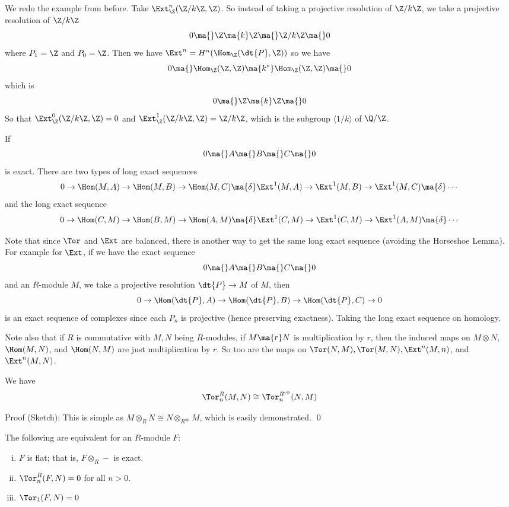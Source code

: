\begin{ex}
We redo the example from before. Take $\Ext_{\Z}^n(\Z/k\Z,\Z)$. So instead of taking a projective resolution of $\Z/k\Z$, we take a projective resolution of $\Z/k\Z$
\[
0 \ma{} \Z \ma{k} \Z \ma{} \Z/k\Z \ma{} 0
\]
where $P_1=\Z$ and $P_0=\Z$. Then we have $\Ext^n=H^n(\Hom_{\Z}(\dt{P},\Z))$ so we have
\[
0 \ma{} \Hom_{\Z}(\Z,\Z) \ma{k^*} \Hom_{\Z}(\Z,\Z) \ma{} 0 
\]
which is
\[
0 \ma{} \Z \ma{k} \Z \ma{} 0
\]
So that $\Ext_{\Z}^0(\Z/k\Z,\Z)=0$ and $\Ext_{\Z}^1(\Z/k\Z,\Z)=\Z/k\Z$, which is the subgroup $\langle 1/k \rangle$ of $\Q/\Z$. 
\end{ex}

\begin{cor}
If 
\[
0 \ma{} A \ma{} B \ma{} C \ma{} 0
\]
is exact. There are two types of long exact sequences
\[
0 \to \Hom(M,A) \to \Hom(M,B) \to \Hom(M,C) \ma{\delta} \Ext^1(M,A) \to \Ext^1(M,B) \to \Ext^1(M,C) \ma{\delta} \cdots
\]
and the long exact sequence
\[
0 \to \Hom(C,M) \to \Hom(B,M) \to \Hom(A,M) \ma{\delta} \Ext^1(C,M) \to \Ext^1(C,M) \to \Ext^1(A,M) \ma{\delta} \cdots
\]
\end{cor}

Note that since $\Tor$ and $\Ext$ are balanced, there is another way to get the same long exact sequence (avoiding the Horseshoe Lemma). For example for $\Ext$, if we have the exact sequence
\[
0 \ma{} A \ma{} B \ma{} C \ma{} 0
\]
and an $R$-module $M$, we take a projective resolution $\dt{P} \to M$ of $M$, then
\[
0 \to \Hom(\dt{P},A) \to \Hom(\dt{P},B) \to \Hom(\dt{P},C) \to 0
\]
is an exact sequence of complexes since each $P_n$ is projective (hence preserving exactness). Taking the long exact sequence on homology.

Note also that if $R$ is commutative with $M,N$ being $R$-modules, if $M \ma{r} N$ is multiplication by $r$, then the induced maps on $M \otimes N$, $\Hom(M,N)$, and $\Hom(N,M)$ are just multiplication by $r$. So too are the maps on $\Tor(N,M),\Tor(M,N),\Ext^n(M,n)$, and $\Ext^n(M,N)$. 

\begin{cor}
We have
\[
\Tor_n^R(M,N) \cong \Tor_n^{R^{\text{op}}}(N,M)
\]
\end{cor}

\noindent Proof (Sketch): This is simple as $M \otimes_R N \cong N \otimes_{R^{\text{op}}} M$, which is easily demonstrated. \qed \\

\begin{cor}
The following are equivalent for an $R$-module $F$:
\begin{enumerate}[(i)]
\item $F$ is flat; that is, $F \otimes_R -$ is exact.
\item $\Tor_n^R(F,N)=0$ for all $n>0$.
\item $\Tor_1(F,N)=0$
\end{enumerate}
\end{cor}

